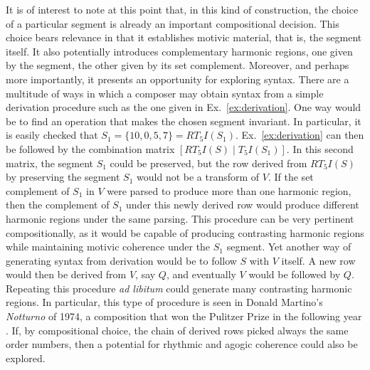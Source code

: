 It is of interest to note at this point that, in this kind of construction, the choice of a particular segment is already an important compositional decision. This choice bears relevance in that it establishes motivic material, that is, the segment itself. It also potentially introduces complementary harmonic regions, one given by the segment, the other given by its set complement. Moreover, and perhaps more importantly, it presents an opportunity for exploring syntax. There are a multitude of ways in which a composer may obtain syntax from a simple derivation procedure such as the one given in Ex.~\ref{ex:derivation}. One way would be to find an operation that makes the chosen segment invariant. In particular, it is easily checked that $S_1 = \{ 10, 0, 5, 7 \} = RT_5I(S_1)$. Ex.~\ref{ex:derivation} can then be followed by the combination matrix $[RT_5I(S) \; | \; T_5I(S_1)]$. In this second matrix, the segment $S_1$ could be preserved, but the row derived from $RT_5I(S)$ by preserving the segment $S_1$ would not be a transform of $V$. If the set complement of $S_1$ in $V$ were parsed to produce more than one harmonic region, then the complement of $S_1$ under this newly derived row would produce different harmonic regions under the same parsing. This procedure can be very pertinent compositionally, as it would be capable of producing contrasting harmonic regions while maintaining motivic coherence under the $S_1$ segment. Yet another way of generating syntax from derivation would be to follow $S$ with $V$ itself. A new row would then be derived from $V$, say $Q$, and eventually $V$ would be followed by $Q$. Repeating this procedure \emph{ad libitum} could generate many contrasting harmonic regions. In particular, this type of procedure is seen in Donald Martino's \emph{Notturno} of 1974, a composition that won the Pulitzer Prize in the following year \cite[181]{Starr1984}. If, by compositional choice, the chain of derived rows picked always the same order numbers, then a potential for rhythmic and agogic coherence could also be explored.


%

